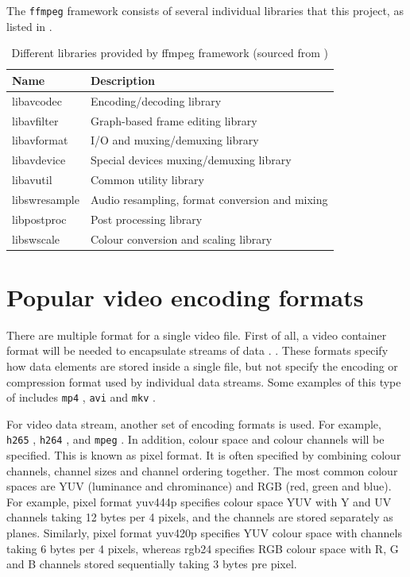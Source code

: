 The \texttt{ffmpeg} framework consists of several individual libraries that \cite{were used together in} this project, as listed in .

\begin{table}[t]
  \centering
  \begin{tabular}{l|l}
    \hline
    \textbf{Name} & \textbf{Description} \\
    \hline
    libavcodec & Encoding/decoding library  \\ \hline
    libavfilter & Graph-based frame editing library \\ \hline
    libavformat & I/O and muxing/demuxing library   \\ \hline
    libavdevice & Special devices muxing/demuxing library \\ \hline
    libavutil & Common utility library    \\ \hline
    libswresample & Audio resampling, format conversion and mixing  \\ \hline
    libpostproc & Post processing library \\ \hline
    libswscale & Colour conversion and scaling library  \\ \hline
  \end{tabular}
  \caption{\footnotesize Different libraries provided by ffmpeg framework (sourced from \cite{ffmpeg})}
  \label{tbl:ffmpeg}
\end{table}

\section{Popular video encoding formats}

There are multiple format  for a single video file. First of all, a video container format will be needed to encapsulate  streams of  data . . These formats specify how data elements are stored inside a single file, but  not specify the encoding or compression format used by individual data streams. Some examples of this type of  includes \texttt{mp4} \cite{mp4}, \texttt{avi} \cite{avi} and \texttt{mkv} \cite{mkv}.

For  video data stream, another set of encoding formats is used. For example, \texttt{h265} \cite{h265}, \texttt{h264} \cite{h264}, and \texttt{mpeg} \cite{mpeg}. In addition,  colour space and colour channels will  be specified. This is known as pixel format. It is often specified by combining colour channels, channel sizes and channel ordering together. The  most common colour spaces are YUV (luminance and chrominance) and RGB (red, green and blue). For example, pixel format yuv444p specifies colour space YUV with Y and UV channels taking 12 bytes per 4 pixels, and the channels are stored separately as planes. Similarly, pixel format yuv420p specifies YUV colour space with channels taking 6 bytes per 4 pixels, whereas rgb24 specifies RGB colour space with R, G and B channels stored sequentially taking 3 bytes pre pixel.

